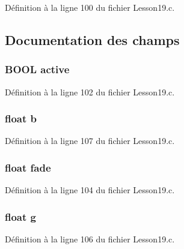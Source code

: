 Définition à la ligne 100 du fichier Lesson19.\+c.



\subsection{Documentation des champs}
\hypertarget{structparticles_a22389371583c4b8843e06da43399d6d9}{}
\subsubsection[{active}]{\setlength{\rightskip}{0pt plus 5cm}B\+O\+O\+L active}\label{structparticles_a22389371583c4b8843e06da43399d6d9}


Définition à la ligne 102 du fichier Lesson19.\+c.

\hypertarget{structparticles_a83fc1af92e29717b4513d121b0c72c7d}{}
\subsubsection[{b}]{\setlength{\rightskip}{0pt plus 5cm}float b}\label{structparticles_a83fc1af92e29717b4513d121b0c72c7d}


Définition à la ligne 107 du fichier Lesson19.\+c.

\hypertarget{structparticles_a4a67cfd76d94f75c28419fe71aeb684f}{}
\subsubsection[{fade}]{\setlength{\rightskip}{0pt plus 5cm}float fade}\label{structparticles_a4a67cfd76d94f75c28419fe71aeb684f}


Définition à la ligne 104 du fichier Lesson19.\+c.

\hypertarget{structparticles_a8cf17d727651616de6f2b79ef32170cd}{}
\subsubsection[{g}]{\setlength{\rightskip}{0pt plus 5cm}float g}\label{structparticles_a8cf17d727651616de6f2b79ef32170cd}


Définition à la ligne 106 du fichier Lesson19.\+c.

\hypertarget{structparticles_a6283673946355f360ce6a174f919a942}{}
